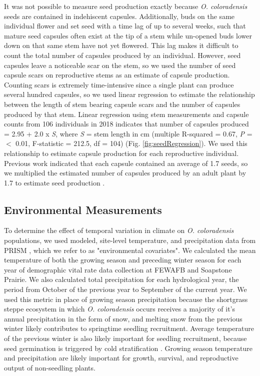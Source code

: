 \documentclass[12pt, letterpaper]{article}
\begin{document}
It was not possible to measure seed production exactly because \textit{O. coloradensis} seeds are contained in indehiscent capsules. Additionally, buds on the same individual flower and set seed with a time lag of up to several weeks, such that mature seed capsules often exist at the tip of a stem while un-opened buds lower down on that same stem have not yet flowered. This lag makes it difficult to count the total number of capsules produced by an individual. However, seed capsules leave a noticeable scar on the stem, so we used the number of seed capsule scars on reproductive stems as an estimate of capsule production. Counting scars is extremely time-intensive since a single plant can produce several hundred capsules, so we used linear regression to estimate the relationship between the length of stem bearing capsule scars and the number of capsules produced by that stem. Linear regression using stem measurements and capsule counts from 106 individuals in 2018 indicates that number of capsules produced =  2.95 + 2.0 \textsf{x} \textit{S}, where \textit{S} = stem length in cm (multiple R-squared = 0.67, \textit{P} = $<$ 0.01, F-statistic = 212.5, df = 104) (Fig. \ref{fig:seedRegression}). We used this relationship to estimate capsule production for each reproductive individual. Previous work indicated that each capsule contained an average of 1.7 seeds, so we multiplied the estimated number of capsules produced by an adult plant by 1.7 to estimate seed production \cite{Burgess2005CapsuleColoradensis}. 

\subsection{Environmental Measurements}
To determine the effect of temporal variation in climate on \textit{O. coloradensis} populations, we used modeled, site-level temperature, and precipitation data from PRISM \cite{PRISMClimateGroupOregonStateUniversity2021PRISMUniversity}, which we refer to as "environmental covariates". We calculated the mean temperature of both the growing season and preceding winter season for each year of demographic vital rate data collection at FEWAFB and Soapstone Prairie. We also calculated total precipitation for each hydrological year, the period from October of the previous year to September of the current year. We used this metric in place of growing season precipitation because the shortgrass steppe ecosystem in which \textit{O. coloradensis} occurs receives a majority of it's annual precipitation in the form of snow, and melting snow from the previous winter likely contributes to springtime seedling recruitment. Average temperature of the previous winter is also likely important for seedling recruitment, because seed germination is triggered by cold stratification \cite{Burgess2005CapsuleColoradensis}. Growing season temperature and precipitation are likely important for growth, survival, and reproductive output of non-seedling plants. 
\end{document}
